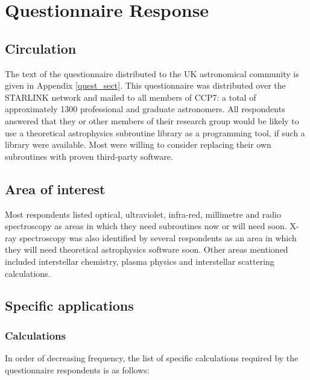 \section {Questionnaire Response}

\subsection {Circulation}
The text of the questionnaire distributed to the UK astronomical
community is given in Appendix \ref{quest_sect}.
This questionnaire was distributed over the STARLINK network and mailed to
all members of CCP7: a total of approximately 1300 professional and graduate
astronomers.
%
All respondents answered that they or other members of their research group
would be likely to use a theoretical astrophysics subroutine library as a
programming tool, if such a library were available.
Most were willing to consider replacing their own subroutines with
proven third-party software.

\subsection {Area of interest}
Most respondents listed optical, ultraviolet, infra-red, millimetre and
radio spectroscopy as areas in which they need subroutines now or
will need soon.
X-ray spectroscopy was also identified by several respondents as an area
in which they will need theoretical astrophysics software soon.
Other areas mentioned included interstellar chemistry, plasma physics and
interstellar scattering calculations.

\subsection {Specific applications}

\subsubsection {Calculations}
In order of decreasing frequency, the list of specific calculations required
by the questionnaire respondents is as follows:

